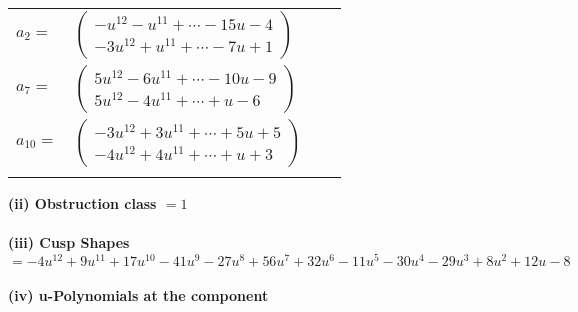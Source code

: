 \documentclass[1p]{elsarticle_modified}
\theoremstyle{definition}
\begin{document}
\begin{tabular}{m{7pt} m{180pt} m{7pt} m{180pt} }
\flushright $a_{2}=$&$\begin{pmatrix}- u^{12}- u^{11}+\cdots-15 u-4\\-3 u^{12}+u^{11}+\cdots-7 u+1\end{pmatrix}$ \\
\flushright $a_{7}=$&$\begin{pmatrix}5 u^{12}-6 u^{11}+\cdots-10 u-9\\5 u^{12}-4 u^{11}+\cdots+u-6\end{pmatrix}$ \\
\flushright $a_{10}=$&$\begin{pmatrix}-3 u^{12}+3 u^{11}+\cdots+5 u+5\\-4 u^{12}+4 u^{11}+\cdots+u+3\end{pmatrix}$\\&\end{tabular}
\flushleft \textbf{(ii) Obstruction class $= 1$}\\~\\
\flushleft \textbf{(iii) Cusp Shapes $= -4 u^{12}+9 u^{11}+17 u^{10}-41 u^9-27 u^8+56 u^7+32 u^6-11 u^5-30 u^4-29 u^3+8 u^2+12 u-8$}\\~\\
\newpage\renewcommand{\arraystretch}{1}
\flushleft \textbf{(iv) u-Polynomials at the component}\newline \\
\end{document}
